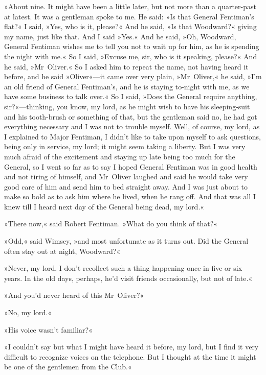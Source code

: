 »About nine. It might have been a little later, but not more than a quarter-past at latest. It was a gentleman spoke to me. He said: »Is that General Fentiman's flat?« I said, »Yes, who is it, please?« And he said, »Is that Woodward?« giving my name, just like that. And I said »Yes.« And he said, »Oh, Woodward, General Fentiman wishes me to tell you not to wait up for him, as he is spending the night with me.« So I said, »Excuse me, sir, who is it speaking, please?« And he said, »Mr~Oliver.« So I asked him to repeat the name, not having heard it before, and he said »Oliver«—it came over very plain, »Mr~Oliver,« he said, »I'm an old friend of General Fentiman's, and he is staying to-night with me, as we have some business to talk over.« So I said, »Does the General require anything, sir?«—thinking, you know, my lord, as he might wish to have his sleeping-suit and his tooth-brush or something of that, but the gentleman said no, he had got everything necessary and I was not to trouble myself. Well, of course, my lord, as I explained to Major Fentiman, I didn't like to take upon myself to ask questions, being only in service, my lord; it might seem taking a liberty. But I was very much afraid of the excitement and staying up late being too much for the General, so I went so far as to say I hoped General Fentiman was in good health and not tiring of himself, and Mr~Oliver laughed and said he would take very good care of him and send him to bed straight away. And I was just about to make so bold as to ask him where he lived, when he rang off. And that was all I knew till I heard next day of the General being dead, my lord.«

»There now,« said Robert Fentiman. »What do you think of that?«

»Odd,« said Wimsey, »and most unfortunate as it turns out. Did the General often stay out at night, Woodward?«

»Never, my lord. I don't recollect such a thing happening once in five or six years. In the old days, perhaps, he'd visit friends occasionally, but not of late.«

»And you'd never heard of this Mr~Oliver?«

»No, my lord.«

»His voice wasn't familiar?«

»I couldn't say but what I might have heard it before, my lord, but I find it very difficult to recognize voices on the telephone. But I thought at the time it might be one of the gentlemen from the Club.«


